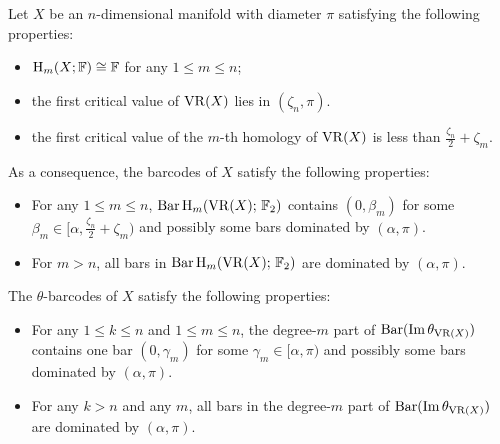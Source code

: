 Let $X$ be an $n$-dimensional manifold with diameter $\pi$ satisfying the following properties:
\begin{itemize}
    \item $\mathrm{H}_m(X; \mathbb{F})\cong \mathbb{F}$ for any $1\leq m\leq n$; 
    \item the first critical value of $\operatorname{VR}(X)$ lies in $(\zeta_n, \pi)$.
    \item the first critical value of the $m$-th homology of $\operatorname{VR}(X)$ is less than $\tfrac{\zeta_n}{2}+\zeta_m.$
\end{itemize}
As a consequence, the barcodes of $X$ satisfy the following properties: 
\begin{itemize}
    \item For any $1\leq m\leq n$, $\operatorname{Bar} \operatorname{H}_{m}(\operatorname{VR}(X);\,{\mathbb{F}_2})$ contains $(0,\beta_m)$ for some $\beta_m\in [\alpha, \tfrac{\zeta_n}{2}+\zeta_m)$ and possibly some bars dominated by $(\alpha, \pi)$.
    \item For $m>n$, all bars in $\operatorname{Bar} \operatorname{H}_{m}(\operatorname{VR}(X);\,{\mathbb{F}_2})$ are dominated by $(\alpha, \pi)$.
\end{itemize}
The $\theta$-barcodes of $X$ satisfy the following properties: 
\begin{itemize}
    \item For any $1\leq k\leq n$  and $1\leq m\leq n$, the degree-$m$ part of $\operatorname{Bar}(\operatorname{Im} \theta_{\operatorname{VR}(X)})$ contains one bar $(0,\gamma_m)$ for some $\gamma_m\in [\alpha, \pi)$ and possibly some bars dominated by $(\alpha, \pi)$. 
    \item For any $k>n$ and any $m$, all bars in the degree-$m$ part of $\operatorname{Bar}(\operatorname{Im} \theta_{\operatorname{VR}(X)})$ are dominated by $(\alpha,\pi)$.
\end{itemize}


% 	

% 	

